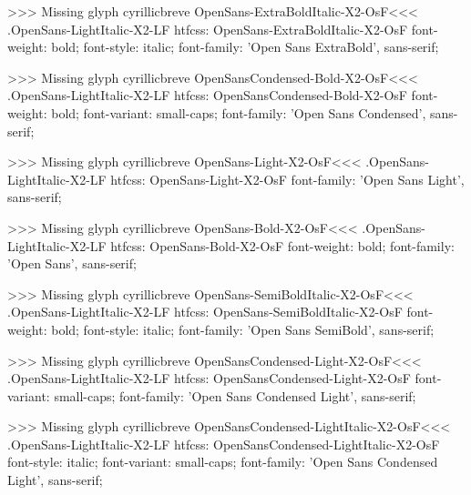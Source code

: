 >>>
Missing glyph	cyrillicbreve
\<OpenSans-ExtraBoldItalic-X2-OsF\><<<
.OpenSans-LightItalic-X2-LF
htfcss:  OpenSans-ExtraBoldItalic-X2-OsF  font-weight: bold; font-style: italic; font-family: 'Open Sans ExtraBold', sans-serif;

>>>
Missing glyph	cyrillicbreve
\<OpenSansCondensed-Bold-X2-OsF\><<<
.OpenSans-LightItalic-X2-LF
htfcss:  OpenSansCondensed-Bold-X2-OsF  font-weight: bold; font-variant: small-caps; font-family: 'Open Sans Condensed', sans-serif;

>>>
Missing glyph	cyrillicbreve
\<OpenSans-Light-X2-OsF\><<<
.OpenSans-LightItalic-X2-LF
htfcss:  OpenSans-Light-X2-OsF  font-family: 'Open Sans Light', sans-serif;

>>>
Missing glyph	cyrillicbreve
\<OpenSans-Bold-X2-OsF\><<<
.OpenSans-LightItalic-X2-LF
htfcss:  OpenSans-Bold-X2-OsF  font-weight: bold; font-family: 'Open Sans', sans-serif;

>>>
Missing glyph	cyrillicbreve
\<OpenSans-SemiBoldItalic-X2-OsF\><<<
.OpenSans-LightItalic-X2-LF
htfcss:  OpenSans-SemiBoldItalic-X2-OsF  font-weight: bold; font-style: italic; font-family: 'Open Sans SemiBold', sans-serif;

>>>
Missing glyph	cyrillicbreve
\<OpenSansCondensed-Light-X2-OsF\><<<
.OpenSans-LightItalic-X2-LF
htfcss:  OpenSansCondensed-Light-X2-OsF  font-variant: small-caps; font-family: 'Open Sans Condensed Light', sans-serif;

>>>
Missing glyph	cyrillicbreve
\<OpenSansCondensed-LightItalic-X2-OsF\><<<
.OpenSans-LightItalic-X2-LF
htfcss:  OpenSansCondensed-LightItalic-X2-OsF  font-style: italic; font-variant: small-caps; font-family: 'Open Sans Condensed Light', sans-serif;

